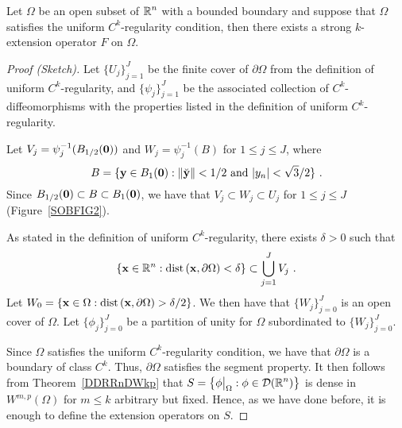 \begin{theorem} \label{sob_Omega_Ext}
Let $\Omega$ be an open subset of $\displaystyle \mathbb{R}^n$ with a bounded boundary
\footnotemark and suppose that $\Omega$ satisfies the uniform
$\displaystyle C^k$-regularity condition, then there exists a strong
$k$-extension operator $F$ on $\Omega$.
\end{theorem}


\begin{proof}[Proof (Sketch)]
Let $\displaystyle \{ U_j \}_{j=1}^J$ be the finite cover
of $\partial \Omega$ from the definition of uniform
$\displaystyle C^k$-regularity, and 
$\displaystyle \{ \psi_j \}_{j=1}^J$ be the associated
collection of $\displaystyle C^k$-diffeomorphisms with the properties
listed in the definition of uniform $\displaystyle C^k$-regularity. 

Let $\displaystyle V_j = \psi_j^{-1}(B_{1/2}(\mathbf{0}))$
and $\displaystyle W_j = \psi_j^{-1}(B)$ for $1\leq j \leq J$, where
\[
B = \{ \VEC{y} \in B_1(\VEC{0}) :
\|\breve{\VEC{y}}\| < 1/2 \ \text{and}\ |y_n| < \sqrt{3}/2 \} \ .
\]
Since $B_{1/2}(\mathbf{0}) \subset B \subset B_1(\mathbf{0})$, we have that
$V_j \subset W_j \subset U_j$ for $1\leq j \leq J$ (Figure~\ref{SOBFIG2}).

As stated in the definition of uniform $\displaystyle C^k$-regularity,
there exists $\delta>0$ such that
\[
\left\{ \mathbf{x} \in \mathbb{R}^n :
\mathrm{dist}\left(\mathbf{x},\partial \Omega\right)  < \delta \right\} \subset
\bigcup_{j=1}^J V_j \ .
\]
Let $\displaystyle W_0 = \left\{ \mathbf{x} \in \Omega :
\mathrm{dist}\left(\mathbf{x},\partial \Omega\right)  > \delta/2 \right\}$.
We then have that $\displaystyle \{ W_j \}_{j=0}^J$ is an open cover
of $\Omega$.
Let $\displaystyle \{ \phi_j \}_{j=0}^J$ be a partition of unity for
$\Omega$ subordinated to $\displaystyle \{ W_j \}_{j=0}^J$.

Since $\Omega$ satisfies the uniform $\displaystyle C^k$-regularity
condition, we have that $\partial \Omega$ is a boundary of class
$\displaystyle C^k$.  Thus, $\partial \Omega$ satisfies the segment
property.  It then follows from Theorem~\ref{DDRRnDWkp} that
$\displaystyle S = \left\{ \phi\big|_{\Omega} : \phi \in \mathcal{D}(\mathbb{R}^n) \right\}$
is dense in $\displaystyle W^{m,p}(\Omega)$ for $m\leq k$ arbitrary
but fixed.  Hence, as we have done
before, it is enough to define the extension operators on $S$.  


\end{proof}
